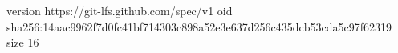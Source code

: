 version https://git-lfs.github.com/spec/v1
oid sha256:14aac9962f7d0fc41bf714303c898a52e3e637d256c435dcb53cda5c97f62319
size 16
